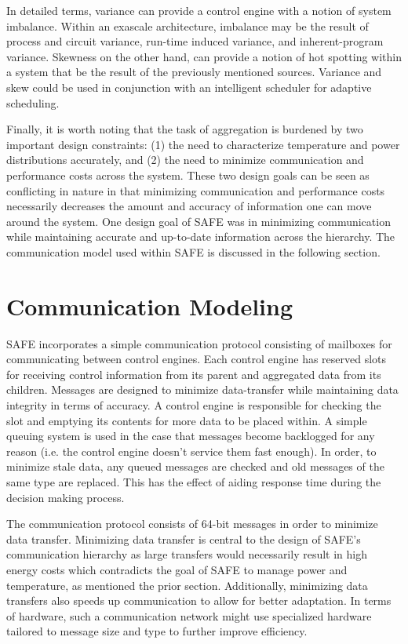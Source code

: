     In detailed terms, variance can provide a control engine with a notion of system imbalance. Within an exascale architecture, imbalance may be the result of process and circuit variance, run-time induced variance, and inherent-program variance. Skewness on the other hand, can provide a notion of hot spotting within a system that be the result of the previously mentioned sources. Variance and skew could be used in conjunction with an intelligent scheduler for adaptive scheduling.

    Finally, it is worth noting that the task of aggregation is burdened by two important design constraints: (1) the need to characterize temperature and power distributions accurately, and (2) the need to minimize communication and performance costs across the system. These two design goals can be seen as conflicting in nature in that minimizing communication and performance costs necessarily decreases the amount and accuracy of information one can move around the system. One design goal of SAFE was in minimizing communication while maintaining accurate and up-to-date information across the hierarchy. The communication model used within SAFE is discussed in the following section.


\section{Communication Modeling}
    SAFE incorporates a simple communication protocol consisting of mailboxes for communicating between control engines. Each control engine has reserved slots for receiving control information from its parent and aggregated data from its children. Messages are designed to minimize data-transfer while maintaining data integrity in terms of accuracy. A control engine is responsible for checking the slot and emptying its contents for more data to be placed within. A simple queuing system is used in the case that messages become backlogged for any reason (i.e. the control engine doesn't service them fast enough). In order, to minimize stale data, any queued messages are checked and old messages of the same type are replaced. This has the effect of aiding response time during the decision making process.

    The communication protocol consists of 64-bit messages in order to minimize data transfer. Minimizing data transfer is central to the design of SAFE's communication hierarchy as large transfers would necessarily result in high energy costs which contradicts the goal of SAFE to manage power and temperature, as mentioned the prior section. Additionally, minimizing data transfers also speeds up communication to allow for better adaptation. In terms of hardware, such a communication network might use specialized hardware tailored to message size and type to further improve efficiency.

